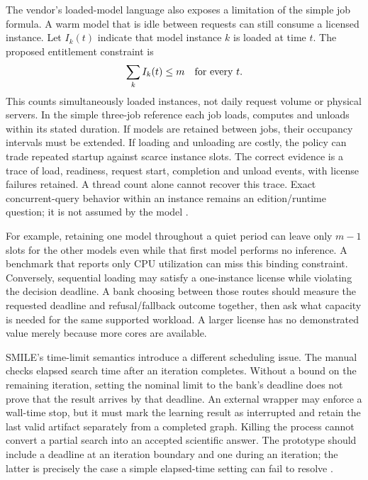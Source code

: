 The vendor's loaded-model language also exposes a limitation of the simple
job formula. A warm model that is idle between requests can still consume a
licensed instance. Let $I_k(t)$ indicate that model instance $k$ is loaded at
time $t$. The proposed entitlement constraint is
\begin{equation}
 \sum_k I_k(t)\leq m\quad\hbox{for every }t.
 \label{exec17:s8-occupancy}
\end{equation}
This counts simultaneously loaded instances, not daily request volume or
physical servers. In the simple three-job reference each job loads, computes
and unloads within its stated duration. If models are retained between jobs,
their occupancy intervals must be extended. If loading and unloading are
costly, the policy can trade repeated startup against scarce instance slots.
The correct evidence is a trace of load, readiness, request start, completion
and unload events, with license failures retained. A thread count alone cannot
recover this trace. Exact concurrent-query behavior within an instance remains
an edition/runtime question; it is not assumed by the model
\citep{exec13_bayesia_api}.

For example, retaining one model throughout a quiet period can leave only
$m-1$ slots for the other models even while that first model performs no
inference. A benchmark that reports only CPU utilization can miss this binding
constraint. Conversely, sequential loading may satisfy a one-instance license
while violating the decision deadline. A bank choosing between those routes
should measure the requested deadline and refusal/fallback outcome together,
then ask what capacity is needed for the same supported workload. A larger
license has no demonstrated value merely because more cores are available.

SMILE's time-limit semantics introduce a different scheduling issue. The
manual checks elapsed search time after an iteration completes. Without a
bound on the remaining iteration, setting the nominal limit to the bank's
deadline does not prove that the result arrives by that deadline. An external
wrapper may enforce a wall-time stop, but it must mark the learning result
as interrupted and retain the last valid artifact separately from a completed
graph. Killing the process cannot convert a partial search into an accepted
scientific answer. The prototype should include a deadline at an iteration
boundary and one during an iteration; the latter is precisely the case a
simple elapsed-time setting can fail to resolve \citep{exec13_smile_pc}.

